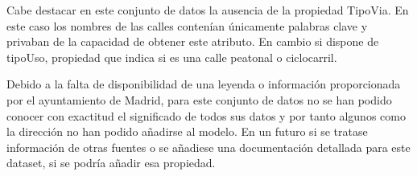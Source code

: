 Cabe destacar en este conjunto de datos la ausencia de la propiedad TipoVia. En este caso los nombres de las calles contenían únicamente palabras clave y privaban de la capacidad de obtener este atributo. En cambio si dispone de tipoUso, propiedad que indica si es una calle peatonal o ciclocarril.


Debido a la falta de disponibilidad de una leyenda o información proporcionada por el ayuntamiento de Madrid, para este conjunto de datos no se han podido conocer con exactitud el significado de todos sus datos y por tanto algunos como la dirección no han podido añadirse al modelo. En un futuro si se tratase información de otras fuentes o se añadiese una documentación detallada para este dataset, si se podría añadir esa propiedad.






